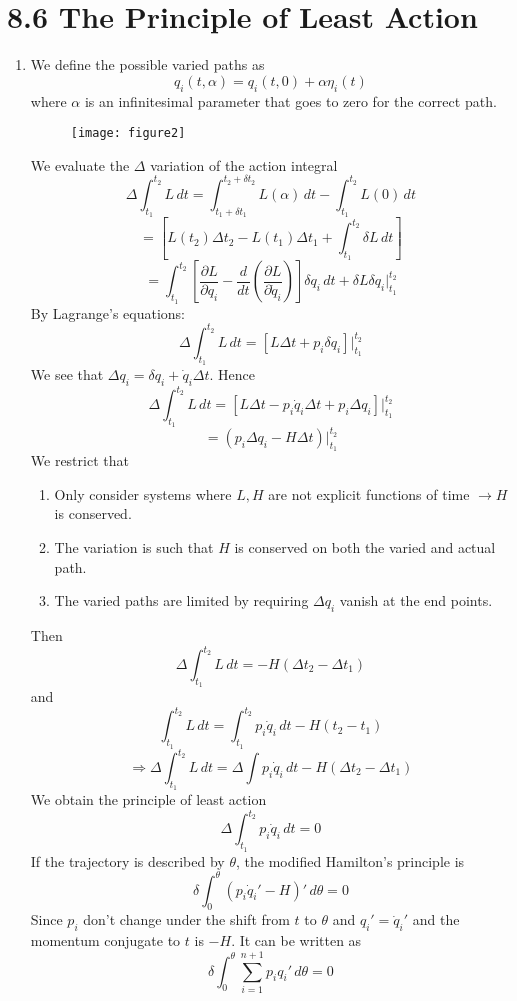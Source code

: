 \documentclass[12pt]{article}
\begin{document}
	\section*{8.6 The Principle of Least Action}
	\begin{enumerate}
		\item We define the possible varied paths as
		\[ q_i(t, \alpha) = q_i(t, 0) + \alpha \eta_i(t) \]
		where $\alpha$ is an infinitesimal parameter that goes to zero for the correct path.
		
		\begin{figure}[h]
			\centering
			\texttt{[image: figure2]}
			\caption{}
			\label{fig:figure2}
		\end{figure}
		
		We evaluate the $\Delta$ variation of the action integral
		\[ \Delta \int_{t_1}^{t_2} L \, dt = \int_{t_1 + \delta t_1}^{t_2 + \delta t_2} L(\alpha) \, dt - \int_{t_1}^{t_2} L(0) \, dt \]
		\[ = [L(t_2) \Delta t_2 - L(t_1) \Delta t_1 + \int_{t_1}^{t_2} \delta L \, dt] \]
		\[ = \int_{t_1}^{t_2} \left[ \frac{\partial L}{\partial q_i} - \frac{d}{dt}\left(\frac{\partial L}{\partial \dot{q}_i}\right) \right] \delta q_i \, dt + \delta L \delta q_i \bigg|_{t_1}^{t_2} \]
		By Lagrange's equations:
		\[ \Delta \int_{t_1}^{t_2} L \, dt = [L \Delta t + p_i \delta q_i] \bigg|_{t_1}^{t_2} \]
		We see that $\Delta q_i = \delta q_i + \dot{q}_i \Delta t$.
		Hence
		\[ \Delta \int_{t_1}^{t_2} L \, dt = [L \Delta t - p_i \dot{q}_i \Delta t + p_i \Delta q_i] \bigg|_{t_1}^{t_2} \]
		\[ = (p_i \Delta q_i - H \Delta t) \bigg|_{t_1}^{t_2} \]
		We restrict that
		\begin{enumerate}
			\item Only consider systems where $L, H$ are not explicit functions of time $\rightarrow H$ is conserved.
			\item The variation is such that $H$ is conserved on both the varied and actual path.
			\item The varied paths are limited by requiring $\Delta q_i$ vanish at the end points.
		\end{enumerate}
		Then
		\[ \Delta \int_{t_1}^{t_2} L \, dt = -H(\Delta t_2 - \Delta t_1) \]
		and
		\[ \int_{t_1}^{t_2} L \, dt = \int_{t_1}^{t_2} p_i \dot{q}_i \, dt - H(t_2 - t_1) \]
		\[ \Rightarrow \Delta \int_{t_1}^{t_2} L \, dt = \Delta \int p_i \dot{q}_i \, dt - H(\Delta t_2 - \Delta t_1) \]
		We obtain the principle of least action
		\[ \Delta \int_{t_1}^{t_2} p_i \dot{q}_i \, dt = 0 \]
		If the trajectory is described by $\theta$, the modified Hamilton's principle is
		\[ \delta \int_0^\theta (p_i \dot{q}_i' - H)' \, d\theta = 0 \]
		Since $p_i$ don't change under the shift from $t$ to $\theta$ and $q_i' = \dot{q}_i'$ and the momentum conjugate to $t$ is $-H$. It can be written as
		\[ \delta \int_0^\theta \sum_{i=1}^{n+1} p_i q_i' \, d\theta = 0 \]
		

\end{enumerate}
\end{document}
